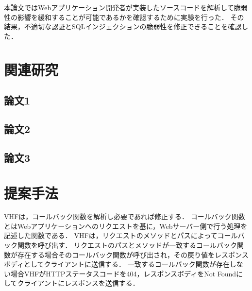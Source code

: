 \documentclass[a4paper,12pt]{jreport}
\begin{document}
本論文ではWebアプリケーション開発者が実装したソースコードを解析して脆弱性の影響を緩和することが可能であるかを確認するために実験を行った．
その結果，不適切な認証とSQLインジェクションの脆弱性を修正できることを確認した．

\chapter{関連研究}
\section{論文1}
\section{論文2}
\section{論文3}

\chapter{提案手法}
VHFは，コールバック関数を解析し必要であれば修正する．
コールバック関数とはWebアプリケーションへのリクエストを基に，Webサーバー側で行う処理を記述した関数である．
VHFは，リクエストのメソッドとパスによってコールバック関数を呼び出す．
リクエストのパスとメソッドが一致するコールバック関数が存在する場合そのコールバック関数が呼び出され，その戻り値をレスポンスボディとしてクライアントに送信する．
一致するコールバック関数が存在しない場合VHFがHTTPステータスコードを404，レスポンスボディをNot Foundにしてクライアントにレスポンスを送信する．
\end{document}

